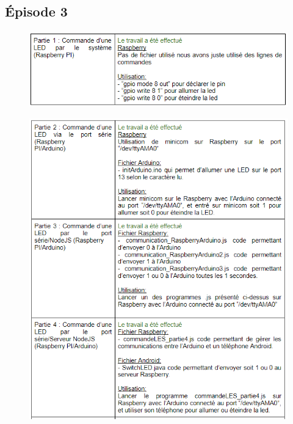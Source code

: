 \documentclass[a4paper,12pt]{report}
\begin{document}
		\subsection{Épisode 3}
			\paragraph*{}
			
			\begin{figure}[H]
				\centering
					\includegraphics[scale=0.8]{images/ep3_1.png}
				\label{ep1}
			\end{figure}
			
			\begin{figure}[H]
				\centering
					\includegraphics[scale=0.8]{images/ep3_2.png}
				\label{ep1}
			\end{figure}
			
\end{document}

